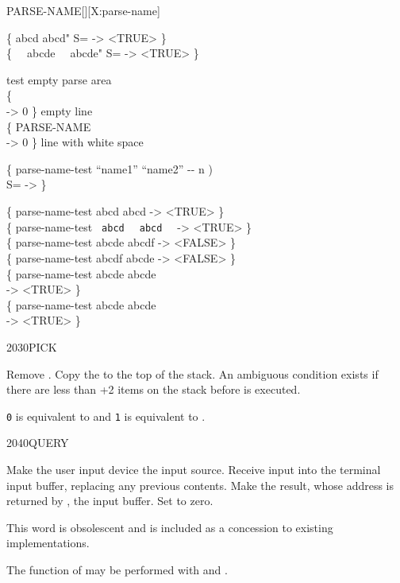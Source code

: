 \begin{worddef}{}{PARSE-NAME}[][X:parse-name]
\begin{defer}
	\testing
		\{  abcd  abcd" S= -> <TRUE> \} \\
		\{  \verb*"  "abcde\verb*"  "  abcde" S= -> <TRUE> \}

		 test empty parse area \\
		\{  \\
		\tab {} -> 0 \}  empty line \\
		\{ PARSE-NAME \verb*"  " \\
		\tab {} -> 0 \}  line with white space

		\{ \word{:} parse-name-test  ``name1'' ``name2'' -{}- n ) \\
		\tab {}  S= \word{;} -> \}

		\{ parse-name-test abcd abcd -> <TRUE> \} \\
		\{ parse-name-test \verb*" abcd" \verb*"  abcd  " -> <TRUE> \} \\
		\{ parse-name-test abcde abcdf -> <FALSE> \} \\
		\{ parse-name-test abcdf abcde -> <FALSE> \} \\
		\{ parse-name-test abcde abcde \\
		\tab -> <TRUE> \} \\
		\{ parse-name-test abcde abcde\verb*"  " \\
		\tab -> <TRUE> \}
	\end{defer}
\end{worddef}


\begin{worddef}{2030}{PICK}
\item {}

	Remove . Copy the  to the top of the stack.
	An ambiguous condition exists if there are less than +2
	items on the stack before  is executed.

	\begin{defer}
	\rationale %
		\texttt{0}  is equivalent to  and
		\texttt{1}  is equivalent to .
	\end{defer}
\end{worddef}


\begin{worddef}{2040}{QUERY}
\item \stack{}{}

	Make the user input device the input source. Receive input into
	the terminal input buffer, replacing any previous contents. Make
	the result, whose address is returned by , the input
	buffer. Set  to zero.

\note
	This word is obsolescent and is included as a concession to
	existing implementations.

	\begin{defer}
	\rationale %
		The function of  may be performed with \word{ACCEPT}
		and \word{EVALUATE}.
	\end{defer}
\end{worddef}


